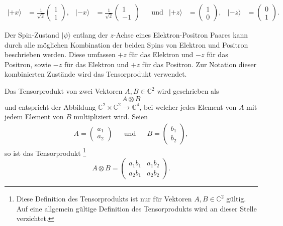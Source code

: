 \begin{refsection}
\begin{align}
    |{+}x\rangle &= \frac{1}{\sqrt{2}}\begin{pmatrix} 1\\1 \end{pmatrix}, &
    |{-}x\rangle &= \frac{1}{\sqrt{2}}\begin{pmatrix} 1\\-1 \end{pmatrix} &
    & \text{und} & 
    |{+}z\rangle &= \begin{pmatrix} 1\\0 \end{pmatrix}, &
    |{-}z\rangle &= \begin{pmatrix} 0\\1 \end{pmatrix}. &
\end{align}

Der Spin-Zustand $|\psi\rangle$ entlang der $z$-Achse eines 
Elektron-Positron Paares  kann durch alle m\"oglichen Kombination der beiden
Spins von Elektron und Positron beschrieben werden. 
Diese umfassen $+z$ f\"ur das Elektron und $-z$
f\"ur das Positron, sowie $-z$ f\"ur das Elektron und $+z$ f\"ur das Positron.
Zur Notation dieser kombinierten Zust\"ande wird das Tensorprodukt verwendet.

\begin{definition}\label{def:bell:tensorprodukt}
    Das Tensorprodukt von zwei Vektoren $A,B \in \mathbb{C}^2$  wird geschrieben als
    \[
        A \otimes B
    \]
    und entspricht der Abbildung $\mathbb{C}^2\times\mathbb{C}^2\to\mathbb{C}^4$, 
    bei welcher jedes Element von $A$ mit jedem Element von $B$ multipliziert
    wird.
    Seien
    \begin{align*}
        A = \begin{pmatrix} a_{1} \\ a_{2} \end{pmatrix}
        && \text{und} &&
        B = \begin{pmatrix} b_{1} \\ b_{2} \end{pmatrix},
    \end{align*}
    so ist das Tensorprodukt 
    \footnote{Diese Definition des Tensorprodukts ist nur f\"ur Vektoren
        $A,B \in \mathbb{C}^2$ g\"ultig. Auf eine allgemein g\"ultige Definition
        des Tensorprodukts wird an dieser Stelle verzichtet.}
    \[
        A \otimes B = \begin{pmatrix} 
        a_1 b_1 & a_1 b_2 \\ a_2 b_1 & a_2 b_2
        \end{pmatrix}.
    \]
\end{definition}


\end{refsection}
